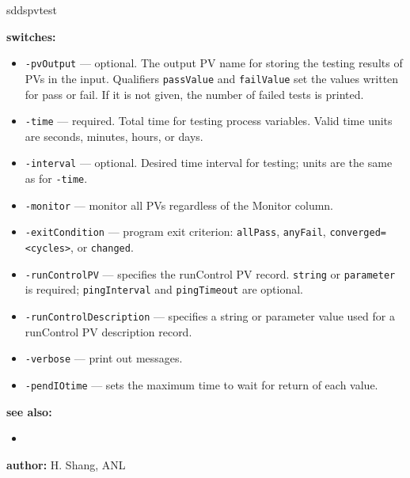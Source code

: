 \begin{sddsprog}{sddspvtest}
\item \textbf{switches:}
    \begin{itemize}
        \item {\tt -pvOutput} --- optional. The output PV name for storing the testing results
               of PVs in the input. Qualifiers \verb|passValue| and \verb|failValue| set
               the values written for pass or fail. If it is not given, the number of
               failed tests is printed.
        \item {\tt -time} --- required. Total time for testing process variables.
               Valid time units are seconds, minutes, hours, or days.
        \item {\tt -interval} --- optional. Desired time interval for testing; units are the
               same as for \verb|-time|.
        \item {\tt -monitor} --- monitor all PVs regardless of the Monitor column.
        \item {\tt -exitCondition} --- program exit criterion: \verb|allPass|, \verb|anyFail|,
               \verb|converged=<cycles>|, or \verb|changed|.
        \item {\tt -runControlPV} --- specifies the runControl PV record. \verb|string| or
               \verb|parameter| is required; \verb|pingInterval| and \verb|pingTimeout|
               are optional.
        \item {\tt -runControlDescription} --- specifies a string or parameter value used
               for a runControl PV description record.
        \item {\tt -verbose} --- print out messages.
        \item {\tt -pendIOtime} --- sets the maximum time to wait for return of each value.
    \end{itemize}
\item \textbf{see also:}
    \begin{itemize}
    \item {}
    \end{itemize}
\item \textbf{author:} H. Shang, ANL
\end{sddsprog}
